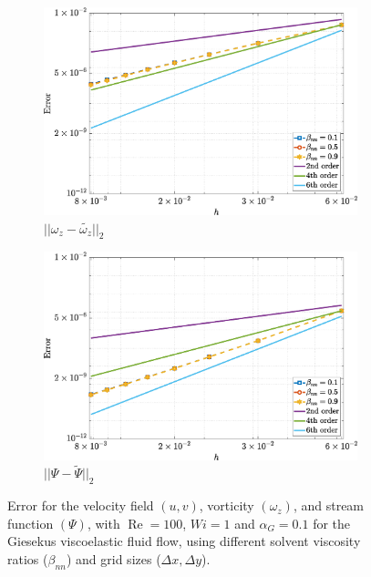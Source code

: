\documentclass[preprint, 12pt]{elsarticle}
\begin{document}
\begin{figure}[H]
\begin{subfigure}[b]{.46\textwidth}
        \includegraphics[width=\textwidth]{NormErr_2nd_Re_100_Wi_1_epsilon_0_xi_0_alphaG_0.1_Dt_1e-06_at_0.05_tipsim_1_MMS_12_Wz.eps}
        \caption{$||\omega_{z} - \widetilde{\omega_{z}}||_{2}$}
        \label{error_wz_2nd_Case1_giesekus_alphaG_0.1}
    \end{subfigure}
    \qquad
    \begin{subfigure}[b]{.46\textwidth}
        \includegraphics[width=\textwidth]{NormErr_2nd_Re_100_Wi_1_epsilon_0_xi_0_alphaG_0.1_Dt_1e-06_at_0.05_tipsim_1_MMS_12_Psi.eps}
        \caption{$||\Psi - \widetilde{\Psi}||_{2}$}
        \label{error_psi_2nd_Case1_oldorydbgiesekus_alphaG_0.1}
    \end{subfigure}
    \vspace{0.02cm}
    \caption{Error for the velocity field $({u},{v})$, vorticity $({\omega_{z}})$, and stream function $({\Psi})$, with $\operatorname{Re}=100$, $Wi=1$ and $\alpha_G=0.1$ for the Giesekus viscoelastic fluid flow, using different solvent viscosity ratios ($\beta_{nn}$) and grid sizes ($\Delta x, \Delta y$).\label{fig_Giesekus_error011}}
\end{figure}
\end{document}
